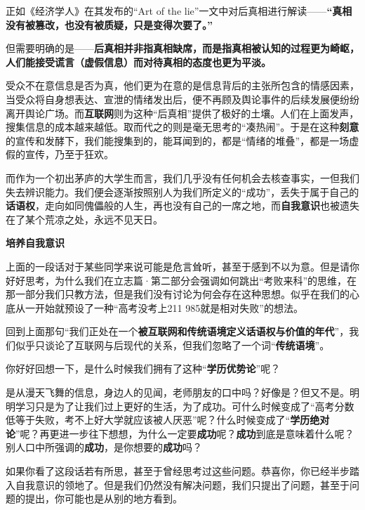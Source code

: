 \documentclass{beamer}	%
\theoremstyle{plain}
\theoremstyle{definition}
\theoremstyle{remark}
\numberwithin{equation}{section}
\begin{document}
\begin{frame}
	正如《经济学人》在其发布的“Art of the lie”一文中对后真相进行解读——\textbf{“真相没有被篡改，也没有被质疑，只是变得次要了。”}
	\vspace{0.5cm}

	但需要明确的是——\textbf{后真相并非指真相缺席，而是指真相被认知的过程更为崎岖，人们能接受谎言（虚假信息）而对待真相的态度也更为平淡。}
	\vspace{0.5cm}
	
	受众不在意信息是否为真，他们更为在意的是信息背后的主张所包含的情感因素，当受众将自身想表达、宣泄的情绪发出后，便不再顾及舆论事件的后续发展便纷纷离开舆论广场。而\textbf{互联网}则为这种“后真相”提供了极好的土壤。人们在上面发声，搜集信息的成本越来越低。取而代之的则是毫无思考的“凑热闹”。于是在这种\textbf{刻意}的宣传和发酵下，我们能搜集到的，能耳闻到的，都是“情绪的堆叠”，都是一场虚假的宣传，乃至于狂欢。
\end{frame}

\begin{frame}
	而作为一个初出茅庐的大学生而言，我们几乎没有任何机会去核查事实，一但我们失去辨识能力。我们便会逐渐按照别人为我们所定义的“成功”，丢失于属于自己的\textbf{话语权}，走向如同傀儡般的人生，再也没有自己的一席之地，而\textbf{自我意识}也被遗失在了某个荒凉之处，永远不见天日。
\end{frame}

\begin{frame}
	\begin{LARGE}
		\textbf{培养自我意识}
	\end{LARGE}
	\vspace{1cm}

	上面的一段话对于某些同学来说可能是危言耸听，甚至于感到不以为意。但是请你好好思考，为什么我们在立志篇·第二部分会强调如何跳出“考败来科”的思维，在那一部分我们只教方法，但是我们没有讨论为何会存在这种思想。似乎在我们的心底从一开始就预设了一种“高考没考上211 985就是相对失败”的想法。
	\vspace{0.5cm}

	回到上面那句“我们正处在一个\textbf{被互联网和传统语境定义话语权与价值的年代}”，我们似乎只谈论了互联网与后现代的关系，但我们忽略了一个词“\textbf{传统语境}”。
\end{frame}

\begin{frame}
	你好好回想一下，是什么时候我们拥有了这种“\textbf{学历优势论}”呢？
	\vspace{0.5cm}

	是从漫天飞舞的信息，身边人的见闻，老师朋友的口中吗？好像是？但又不是。明明学习只是为了让我们过上更好的生活，为了成功。可什么时候变成了“高考分数低等于失败，考不上好大学就应该被人厌恶”呢？什么时候变成了“\textbf{学历绝对论}”呢？再更进一步往下想想，为什么一定要\textbf{成功}呢？\textbf{成功}到底是意味着什么呢？别人口中所强调的\textbf{成功}，是你想要的\textbf{成功}吗？
	\vspace{0.5cm}
	
	如果你看了这段话若有所思，甚至于曾经思考过这些问题。恭喜你，你已经半步踏入自我意识的领地了。但是我们仍然没有解决问题，我们只提出了问题，甚至于问题的提出，你可能也是从别的地方看到。
\end{frame}
\end{document}
